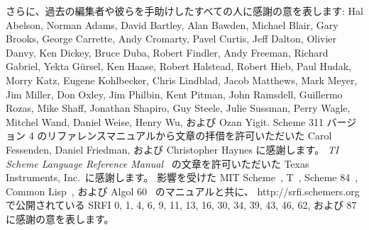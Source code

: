 さらに、過去の編集者や彼らを手助けしたすべての人に感謝の意を表します:
Hal Abelson, Norman Adams, David
Bartley, Alan Bawden, Michael Blair, Gary Brooks, George Carrette,
Andy Cromarty, Pavel Curtis, Jeff Dalton, Olivier Danvy, Ken Dickey,
Bruce Duba, Robert Findler, Andy Freeman, Richard Gabriel, Yekta
G\"ursel, Ken Haase, Robert Halstead, Robert Hieb, Paul Hudak, Morry
Katz, Eugene Kohlbecker, Chris Lindblad, Jacob Matthews, Mark Meyer,
Jim Miller, Don Oxley, Jim Philbin, Kent Pitman, John Ramsdell,
Guillermo Rozas, Mike Shaff, Jonathan Shapiro, Guy Steele, Julie
Sussman, Perry Wagle, Mitchel Wand, Daniel Weise, Henry Wu, および Ozan
Yigit.
Scheme 311 バージョン 4 のリファレンスマニュアルから文章の拝借を許可いただいた
Carol Fessenden, Daniel Friedman, および Christopher Haynes に感謝します。
{\em TI Scheme Language Reference Manual}~\cite{TImanual85}
の文章を許可いただいた Texas Instruments, Inc.~に感謝します。
影響を受けた MIT Scheme~\cite{MITScheme}, T~\cite{Rees84},
Scheme 84~\cite{Scheme84}, Common Lisp~\cite{CLtL},
および Algol 60~\cite{Naur63} のマニュアルと共に、
{\cf http://srfi.schemers.org} で公開されている
SRFI 0, 1, 4, 6, 9, 11, 13, 16, 30, 34, 39, 43, 46, 62, および 87
に感謝の意を表します。


